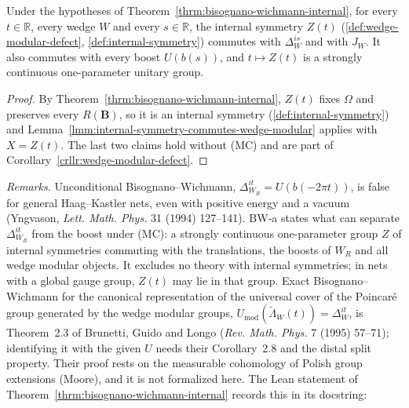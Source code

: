 \begin{corollary}
    \label{crllr:bw-defect-commutes-wedge-modular}
    \leanok
    Under the hypotheses of Theorem~\ref{thrm:bisognano-wichmann-internal}, for every $t \in \mathbb{R}$, every wedge $W$ and every $s \in \mathbb{R}$, the internal symmetry $Z(t)$ (\ref{def:wedge-modular-defect}, \ref{def:internal-symmetry}) commutes with $\Delta_W^{is}$ and with $J_W$. It also commutes with every boost $U(b(s))$, and $t \mapsto Z(t)$ is a strongly continuous one-parameter unitary group.
\end{corollary}
\begin{proof}
    \leanok
    By Theorem~\ref{thrm:bisognano-wichmann-internal}, $Z(t)$ fixes $\Omega$ and preserves every $R(\mathbf{B})$, so it is an internal symmetry (\ref{def:internal-symmetry}) and Lemma~\ref{lmm:internal-symmetry-commutes-wedge-modular} applies with $X = Z(t)$. The last two claims hold without (MC) and are part of Corollary~\ref{crllr:wedge-modular-defect}.
\end{proof}

\emph{Remarks.} Unconditional Bisognano--Wichmann, $\Delta_{W_R}^{it} = U(b(-2\pi t))$, is false for general Haag--Kastler nets, even with positive energy and a vacuum (Yngvason, \emph{Lett. Math. Phys.} 31 (1994) 127--141). BW-a states what can separate $\Delta_{W_R}^{it}$ from the boost under (MC): a strongly continuous one-parameter group $Z$ of internal symmetries commuting with the translations, the boosts of $W_R$ and all wedge modular objects. It excludes no theory with internal symmetries; in nets with a global gauge group, $Z(t)$ may lie in that group. Exact Bisognano--Wichmann for the canonical representation of the universal cover of the Poincar\'e group generated by the wedge modular groups, $U_{\mathrm{mod}}(\tilde\Lambda_W(t)) = \Delta_W^{it}$, is Theorem~2.3 of Brunetti, Guido and Longo (\emph{Rev. Math. Phys.} 7 (1995) 57--71); identifying it with the given $U$ needs their Corollary~2.8 and the distal split property. Their proof rests on the measurable cohomology of Polish group extensions (Moore), and it is not formalized here. The Lean statement of Theorem~\ref{thrm:bisognano-wichmann-internal} records this in its docstring:


